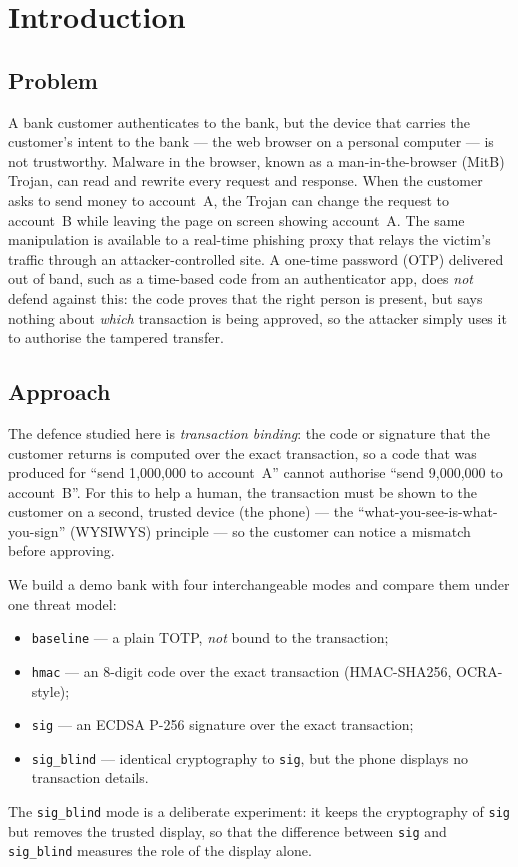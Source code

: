 \section{Introduction}\label{sec:intro}

\subsection{Problem}
A bank customer authenticates to the bank, but the device that carries the
customer's intent to the bank --- the web browser on a personal computer --- is
not trustworthy. Malware in the browser, known as a man-in-the-browser (MitB)
Trojan, can read and rewrite every request and response. When the customer asks
to send money to account~A, the Trojan can change the request to account~B while
leaving the page on screen showing account~A. The same manipulation is available
to a real-time phishing proxy that relays the victim's traffic through an
attacker-controlled site. A one-time password (OTP) delivered out of band, such
as a time-based code from an authenticator app, does \emph{not} defend against
this: the code proves that the right person is present, but says nothing about
\emph{which} transaction is being approved, so the attacker simply uses it to
authorise the tampered transfer.

\subsection{Approach}
The defence studied here is \emph{transaction binding}: the code or signature
that the customer returns is computed over the exact transaction, so a code that
was produced for ``send 1{,}000{,}000 to account~A'' cannot authorise ``send
9{,}000{,}000 to account~B''. For this to help a human, the transaction must be
shown to the customer on a second, trusted device (the phone) --- the
``what-you-see-is-what-you-sign'' (WYSIWYS) principle --- so the customer can
notice a mismatch before approving.

We build a demo bank with four interchangeable modes and compare them under one
threat model:
\begin{itemize}
  \item \texttt{baseline} --- a plain TOTP, \emph{not} bound to the transaction;
  \item \texttt{hmac} --- an 8-digit code over the exact transaction (HMAC-SHA256, OCRA-style);
  \item \texttt{sig} --- an ECDSA P-256 signature over the exact transaction;
  \item \texttt{sig\_blind} --- identical cryptography to \texttt{sig}, but the
        phone displays no transaction details.
\end{itemize}
The \texttt{sig\_blind} mode is a deliberate experiment: it keeps the
cryptography of \texttt{sig} but removes the trusted display, so that the
difference between \texttt{sig} and \texttt{sig\_blind} measures the role of the
display alone.

